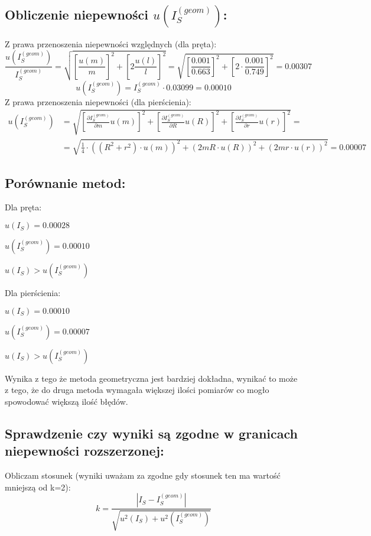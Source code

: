 \documentclass{article}
\begin{document}
	\subsection{Obliczenie niepewności $u(I_{S}^{(geom)})$:}
	Z prawa przenoszenia niepewności względnych (dla pręta):
	\[
	    \frac{u(I_{S}^{(geom)})}{I_{S}^{(geom)}}=\sqrt{\left[\frac{u(m)}{m}\right]^{2}+\left[2\frac{u(l)}{l}\right]^{2}} = \sqrt{\left[\frac{0.001}{0.663}\right]^{2}+\left[2\cdot\frac{0.001}{0.749}\right]^{2}} = 0.00307
	\]
	\[
	    u(I_{S}^{(geom)})=I_{S}^{(geom)}\cdot 0.03099=0.00010
	\]
	Z prawa przenoszenia niepewności (dla pierścienia):
	\begin{equation}
    \begin{split}
	    u(I_{S}^{(geom)})&=\sqrt{\left[\frac{\partial{}I_{S}^{(geom)}}{\partial{}m}u(m)\right]^{2}+\left[\frac{\partial{}I_{S}^{(geom)}}{\partial{}R}u(R)\right]^{2}+\left[\frac{\partial{}I_{S}^{(geom)}}{\partial{}r}u(r)\right]^{2}} =\\&= \sqrt{\frac{1}{4}\cdot((R^{2}+r^{2})\cdot u(m))^{2}+(2mR\cdot u(R))^{2}+(2mr\cdot u(r))^{2}}= 0.00007 
    \end{split}
	\end{equation}

    \subsection{Porównanie metod:}
    Dla pręta:
    
                $u(I_{S})=0.00028$
                
        	    $u(I_{S}^{(geom)})=0.00010$
        	    
        	    $u(I_{S}) > u(I_{S}^{(geom)})$
    
    \noindent Dla pierścienia:
    
                $u(I_{S})=0.00010$
                
        	    $u(I_{S}^{(geom)})=0.00007$
        	    
        	    $u(I_{S}) > u(I_{S}^{(geom)})$
        	    
    \noindent Wynika z tego że metoda geometryczna jest bardziej dokładna, wynikać to może z tego, że do druga metoda wymagała większej ilości pomiarów co mogło spowodować większą ilość błędów.
        	    
    \subsection{Sprawdzenie czy wyniki są zgodne w granicach niepewności rozszerzonej:}
    Obliczam stosunek (wyniki uważam za zgodne gdy stosunek ten ma wartość mniejszą od k=2):
    \[
        k=\frac{\left|I_{S}-I_{S}^{(geom)}\right|}{\sqrt{u^{2}(I_{S})+u^{2}(I_{S}^{(geom)})}}
    \]
    
\end{document}
